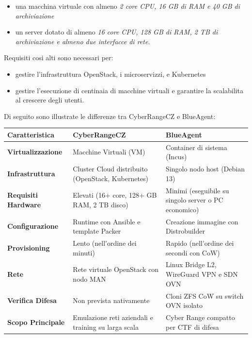 \begin{itemize}
\tightlist
\item
  una macchina virtuale con almeno \emph{2 core CPU, 16 GB di RAM e 40
  GB di archiviazione}
\item
  un server dotato di almeno \emph{16 core CPU, 128 GB di RAM, 2 TB di
  archiviazione e almeno due interfacce di rete.}
\end{itemize}

Requisiti cosi alti sono necessari per:

\begin{itemize}
\tightlist
\item
  gestire l'infrastruttura OpenStack, i microservizzi, e Kubernetes
\item
  gestire l'esecuzione di centinaia di macchine virtuali e garantire la
  scalabilita al crescere degli utenti.
\end{itemize}

Di seguito sono illustrate le differenze tra CyberRangeCZ e BlueAgent:

{\def\LTcaptype{none} %
\begin{longtable}[]{@{}
  >{\raggedright\arraybackslash}p{}
  >{\raggedright\arraybackslash}p{}
  >{\raggedright\arraybackslash}p{}@{}}
\toprule\noalign{}
\begin{minipage}[b]{\linewidth}\raggedright
Caratteristica
\end{minipage} & \begin{minipage}[b]{\linewidth}\raggedright
CyberRangeCZ
\end{minipage} & \begin{minipage}[b]{\linewidth}\raggedright
BlueAgent
\end{minipage} \\
\midrule\noalign{}
\endhead
\bottomrule\noalign{}
\endlastfoot
\textbf{Virtualizzazione} & Macchine Virtuali (VM) & Container di
sistema (Incus) \\
\textbf{Infrastruttura} & Cluster Cloud distribuito (OpenStack,
Kubernetes) & Singolo nodo host (Debian 13) \\
\textbf{Requisiti Hardware} & Elevati (16+ core, 128+ GB RAM, 2 TB
disco) & Minimi (eseguibile su singolo server o PC economico) \\
\textbf{Configurazione} & Runtime con Ansible e template Packer &
Creazione immagine con Distrobuilder \\
\textbf{Provisioning} & Lento (nell'ordine dei minuti) & Rapido
(nell'ordine dei secondi con CoW) \\
\textbf{Rete} & Rete virtuale OpenStack con nodo MAN & Linux Bridge L2,
WireGuard VPN e SDN OVN \\
\textbf{Verifica Difesa} & Non prevista nativamente & Cloni ZFS CoW su
switch OVN isolato \\
\textbf{Scopo Principale} & Emulazione reti aziendali e training su
larga scala & Cyber Range compatto per CTF di difesa \\
\end{longtable}
}
